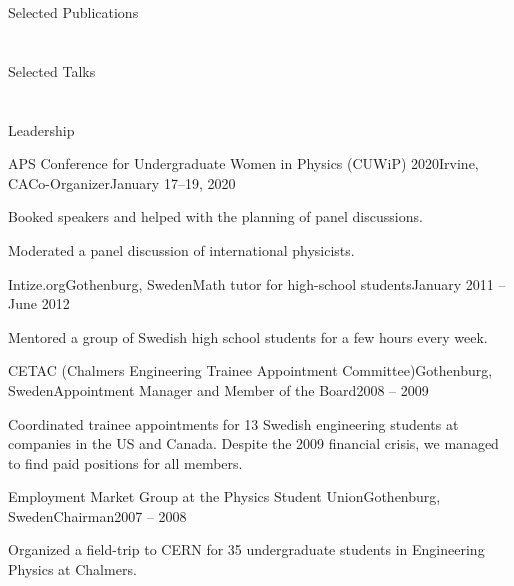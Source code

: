 \documentclass{resume}
\makeatletter
\newcommand\removebibheader
  {\xpatchcmd\std@thebibliography
    {\section*{\refname}%
     \@mkboth{\MakeUppercase\refname}{\MakeUppercase\refname}%
    }{}{}{}%
  }
\let\origsection\section%
\let\section\subsection%
\let\section\origsection%
\makeatother
\begin{document}
\begin{rsection}{Selected Publications}
{\removebibheader
{}
}
\end{rsection}


\begin{rsection}{Selected Talks}
{\removebibheader
{}
}
\end{rsection}


\begin{rsection}{Leadership}

  \begin{rsubsection}{APS Conference for Undergraduate Women in Physics (CUWiP) 2020}{Irvine, CA}{Co-Organizer}{January 17--19, 2020}
  \item Booked speakers and helped with the planning of panel discussions.
  \item Moderated a panel discussion of international physicists.  
  \end{rsubsection}

  \begin{rsubsection}{Intize.org}{Gothenburg, Sweden}{Math tutor for high-school students}{January 2011 -- June 2012}
  \item Mentored a group of Swedish high school students for a few hours every week.  
  \end{rsubsection}


  \begin{rsubsection}{CETAC (Chalmers Engineering Trainee Appointment Committee)}{Gothenburg, Sweden}{Appointment Manager and Member of the Board}{2008 -- 2009}
	\item Coordinated trainee appointments for 13 Swedish engineering students at companies in the US and Canada. Despite the 2009 financial crisis, we managed to find paid positions for all members. 
  \end{rsubsection}


  \begin{rsubsection}{Employment Market Group at the Physics Student Union}{Gothenburg, Sweden}{Chairman}{2007 -- 2008}
		\item Organized a field-trip to CERN for 35 undergraduate students in Engineering Physics at Chalmers.
  \end{rsubsection}

\end{rsection}
\end{document}
